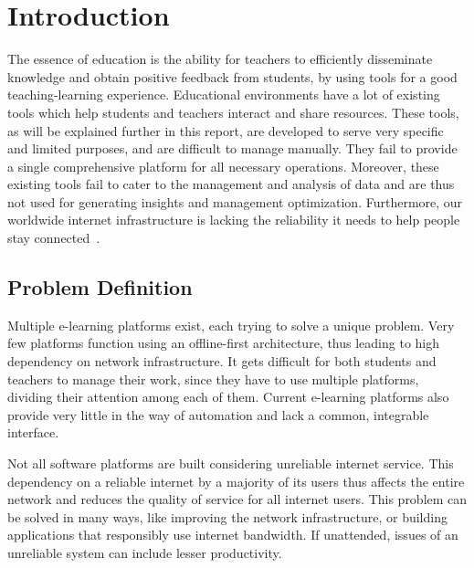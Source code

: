 \chapter{\centering Introduction}

\pagestyle{fancy}
\lhead{}
\rhead{}
\cfoot{}
\rfoot{\thepage}
\renewcommand{\headrulewidth}{2pt}
\renewcommand{\footrulewidth}{0.8pt}


The essence of education is the ability for teachers to efficiently 
disseminate knowledge and obtain positive feedback from students, by 
using tools for a good teaching-learning experience. 
Educational environments have a lot of existing tools which help students and teachers interact and share resources. These tools, as will be explained further in this report, are developed to serve very specific and limited purposes, and are difficult to manage manually. They fail to provide a 
single comprehensive platform for all necessary operations. 
Moreover, these existing tools fail to cater to the management and analysis of data and are thus not used for generating insights and management optimization. 
Furthermore, our worldwide internet infrastructure is lacking the reliability it needs to help people stay connected~\cite{WebF20}.

\section{Problem Definition}

Multiple e-learning platforms exist, each trying to solve a unique problem. 
Very few platforms function using an offline-first architecture, thus leading to 
high dependency on network infrastructure. 
It gets difficult for both students and teachers to manage their work, 
since they have to use multiple platforms, dividing their attention among each of them. 
Current e-learning platforms also provide very little in the way of automation and lack a common, integrable interface.

Not all software platforms are built considering unreliable internet service. 
This dependency on a reliable internet by a majority of its users thus affects the entire network and reduces the quality of service for all internet users. This problem can be solved in many ways, 
like improving the network infrastructure, or building applications that responsibly use internet bandwidth. If unattended, issues of an unreliable system can include lesser productivity.

